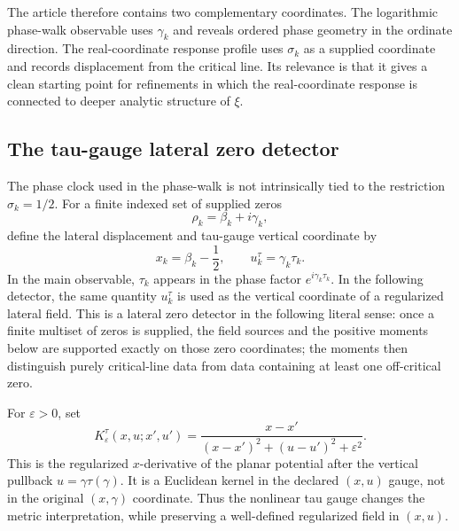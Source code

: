 \documentclass[12pt]{article}
\numberwithin{equation}{section}
\begin{document}
\noindent The article therefore contains two complementary coordinates.  The logarithmic phase-walk observable uses \(\gamma_k\) and reveals ordered phase geometry in the ordinate direction.  The real-coordinate response profile uses \(\sigma_k\) as a supplied coordinate and records displacement from the critical line.  Its relevance is that it gives a clean starting point for refinements in which the real-coordinate response is connected to deeper analytic structure of \(\xi\).


\subsection{The tau-gauge lateral zero detector}
\label{subsec:tau_lateral_zero_detector}

\noindent The phase clock used in the phase-walk is not intrinsically tied to the restriction \(\sigma_k=1/2\).  For a finite indexed set of supplied zeros
\[
\rho_k=\beta_k+i\gamma_k,
\]
define the lateral displacement and tau-gauge vertical coordinate by
\begin{equation}
x_k=\beta_k-\frac{1}{2},
\qquad
u_k^{\tau}=\gamma_k\tau_k.
\label{eq:tau_lateral_coordinates}
\end{equation}
In the main observable, \(\tau_k\) appears in the phase factor \(e^{i\gamma_k\tau_k}\).  In the following detector, the same quantity \(u_k^{\tau}\) is used as the vertical coordinate of a regularized lateral field.  This is a lateral zero detector in the following literal sense: once a finite multiset of zeros is supplied, the field sources and the positive moments below are supported exactly on those zero coordinates; the moments then distinguish purely critical-line data from data containing at least one off-critical zero.

\noindent For \(\varepsilon>0\), set
\begin{equation}
K_{\varepsilon}^{\tau}(x,u;x',u')
=
\frac{x-x'}
{(x-x')^2+(u-u')^2+\varepsilon^2}.
\label{eq:tau_lateral_kernel}
\end{equation}
This is the regularized \(x\)-derivative of the planar potential after the vertical pullback \(u=\gamma\tau(\gamma)\).  It is a Euclidean kernel in the declared \((x,u)\) gauge, not in the original \((x,\gamma)\) coordinate.  Thus the nonlinear tau gauge changes the metric interpretation, while preserving a well-defined regularized field in \((x,u)\).
\end{document}
